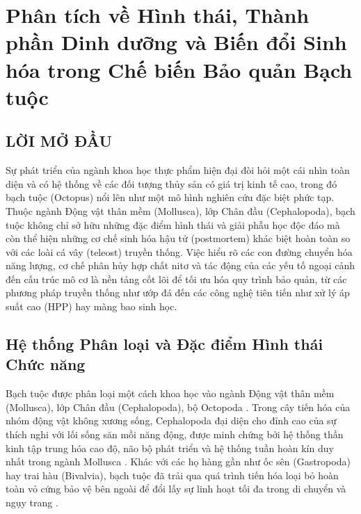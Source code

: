 \documentclass[12pt,a4paper]{report}
\begin{document}
\renewcommand{\contentsname}{MỤC LỤC}
\tableofcontents
\newpage

\setcounter{page}{1}
\pagestyle{fancy}

\chapter{Phân tích về Hình thái, Thành phần Dinh dưỡng và Biến đổi Sinh hóa trong Chế biến Bảo quản Bạch tuộc}

\section*{LỜI MỞ ĐẦU}

Sự phát triển của ngành khoa học thực phẩm hiện đại đòi hỏi một cái nhìn toàn diện và có hệ thống về các đối tượng thủy sản có giá trị kinh tế cao, trong đó bạch tuộc (Octopus) nổi lên như một mô hình nghiên cứu đặc biệt phức tạp. Thuộc ngành Động vật thân mềm (Mollusca), lớp Chân đầu (Cephalopoda), bạch tuộc không chỉ sở hữu những đặc điểm hình thái và giải phẫu học độc đáo mà còn thể hiện những cơ chế sinh hóa hậu tử (postmortem) khác biệt hoàn toàn so với các loài cá vây (teleost) truyền thống. Việc hiểu rõ các con đường chuyển hóa năng lượng, cơ chế phân hủy hợp chất nitơ và tác động của các yếu tố ngoại cảnh đến cấu trúc mô cơ là nền tảng cốt lõi để tối ưu hóa quy trình bảo quản, từ các phương pháp truyền thống như ướp đá đến các công nghệ tiên tiến như xử lý áp suất cao (HPP) hay màng bao sinh học.

\section{Hệ thống Phân loại và Đặc điểm Hình thái Chức năng}

Bạch tuộc được phân loại một cách khoa học vào ngành Động vật thân mềm (Mollusca), lớp Chân đầu (Cephalopoda), bộ Octopoda \cite{ck12_mollusca}. Trong cây tiến hóa của nhóm động vật không xương sống, Cephalopoda đại diện cho đỉnh cao của sự thích nghi với lối sống săn mồi năng động, được minh chứng bởi hệ thống thần kinh tập trung hóa cao độ, não bộ phát triển và hệ thống tuần hoàn kín duy nhất trong ngành Mollusca \cite{ck12_mollusca}. Khác với các họ hàng gần như ốc sên (Gastropoda) hay trai hàu (Bivalvia), bạch tuộc đã trải qua quá trình tiến hóa loại bỏ hoàn toàn vỏ cứng bảo vệ bên ngoài để đổi lấy sự linh hoạt tối đa trong di chuyển và ngụy trang \cite{ck12_mollusca}.
\end{document}
